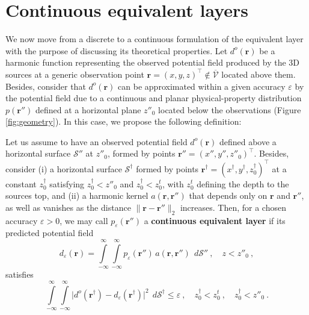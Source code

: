 \section{Continuous equivalent layers}
\label{sec:planar_eqlayer}

We now move from a discrete to a continuous formulation of the equivalent layer with 
the purpose of discussing its theoretical properties.
Let $d^{o}(\mathbf{r})$ be a harmonic function representing the observed potential field 
produced by the 3D sources at a generic observation point 
$\mathbf{r} = ( x , y , z )^{\top} \notin \overline{\mathcal{V}}$ located above them.
Besides, consider that $d^{o}(\mathbf{r})$ can be approximated within a given accuracy $\varepsilon$ 
by the potential field due to a continuous and planar physical-property 
distribution $p(\mathbf{r}'')$ defined at a horizontal plane $z''_{0}$ located below the 
observations (Figure \ref{fig:geometry}). 
In this case, we propose the following definition:

\begin{definition}
	Let us assume to have an observed potential field $d^{o}(\mathbf{r})$ defined above 
	a horizontal surface $\mathcal{S}''$ at $z''_{0}$, formed by points 
	$\mathbf{r}'' = ( x'' , y'' , z''_{0} )^{\top}$. 
	Besides, consider (i) a horizontal surface $\mathcal{S}^{\dagger}$ formed by points 
	$\mathbf{r}^{\dagger} = ( x^{\dagger} , y^{\dagger} , z^{\dagger}_{0} )^{\top}$ at a constant 
	$z^{\dagger}_{0}$ satisfying $z^{\dagger}_{0} < z''_{0}$ and $z^{\dagger}_{0} < z^{t}_{0}$, 
	with $z^{t}_{0}$ defining the depth to the sources top, and (ii) a harmonic kernel 
	$a(\mathbf{r}, \mathbf{r}'')$ that depends only on $\mathbf{r}$ and $\mathbf{r}''$, as well as 
	vanishes as the distance $\| \mathbf{r} - \mathbf{r}'' \|_{2}$ increases. 
	Then, for a chosen accuracy $\varepsilon > 0$, we may call $p_{\varepsilon}(\mathbf{r}'')$ 
	a \textbf{continuous equivalent layer} if its predicted potential field 
	\begin{equation}
		d_{\varepsilon}(\mathbf{r})
		= \int\limits_{-\infty}^{\infty}\int\limits_{-\infty}^{\infty}
		p_{\varepsilon}(\mathbf{r}'') \, a(\mathbf{r}, \mathbf{r}'') \:\: d\mathcal{S}''
		\: , \quad z < z''_{0} \: ,
		\label{eq:predicted-data-integral}
	\end{equation}
	satisfies 
	\begin{equation}
		\int\limits_{-\infty}^{\infty} \int\limits_{-\infty}^{\infty}
		\vert d^{o}(\mathbf{r}^{\dagger}) - 
		d_{\varepsilon}(\mathbf{r}^{\dagger}) \vert^{2}
		\:\: d\mathcal{S}^{\dagger} \le \varepsilon \: ,
		\quad z^{\dagger}_{0} < z^{t}_{0} \: , \quad z^{\dagger}_{0} < z''_{0} \: .
		\label{eq:epsilon-bound-data}
		\end{equation}
	\label{def:continuous-eqlayer}
\end{definition}

